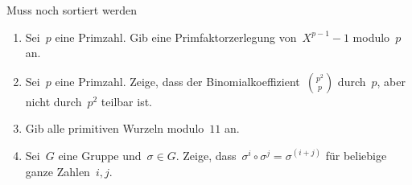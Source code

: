 \documentclass{algblatt}
\begin{document}
\begin{aufgabe}{Muss noch sortiert werden}
\begin{enumerate}
\item Sei~$p$ eine Primzahl. Gib eine Primfaktorzerlegung von~$X^{p-1}-1$
modulo~$p$ an.
\item Sei~$p$ eine Primzahl. Zeige, dass der
Binomialkoeffizient~$\binom{p^2}{p}$ durch~$p$, aber nicht durch~$p^2$ teilbar
ist.
\item Gib alle primitiven Wurzeln modulo~$11$ an.
\item Sei~$G$ eine Gruppe und~$\sigma \in G$. Zeige, dass~$\sigma^i \circ
\sigma^j = \sigma^(i + j)$ für beliebige ganze Zahlen~$i,j$.
\end{enumerate}
\end{aufgabe}
\end{document}
